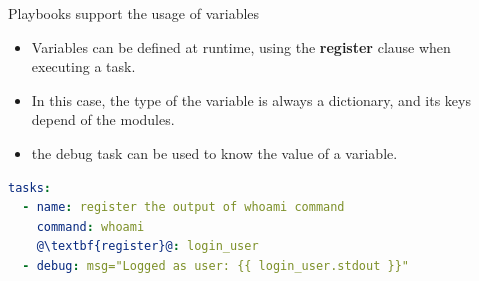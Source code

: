 \documentclass[xcolor=dvipsnames,slidestop, mathserif]{beamer}
\begin{document}
\begin{frame}[fragile]{Playbooks support the usage of variables}
  \begin{itemize}
    \item Variables can be defined at runtime, using the \textbf{register} clause when executing a task.
    \item In this case, the type of the variable is always a dictionary, and its keys depend of the modules.
    \item the debug task can be used to know the value of a variable.
  \end{itemize}
\begin{lstlisting}[language=yaml, frame=tb,escapechar=@]
tasks:
  - name: register the output of whoami command
    command: whoami
    @\textbf{register}@: login_user
  - debug: msg="Logged as user: {{ login_user.stdout }}"
\end{lstlisting}
\end{frame}
\end{document}
